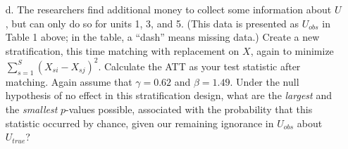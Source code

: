 \documentclass{article}
\newcommand\independent{\protect\mathpalette{\protect\independenT}{\perp}}
\def\independenT#1#2{\mathrel{\rlap{$#1#2$}\mkern2mu{#1#2}}}
\begin{document}

\begin{itemize}
\item[d.] The researchers find additional money to collect some
  information about $U$, but can only do so for units 1, 3, and 5.
  (This data is presented as $U_{obs}$ in Table 1 above; in the table,
  a ``dash'' means missing data.)  Create a new stratification, this
  time matching with replacement on $X$, again to minimize
  $\sum_{s=1}^{S}(X_{si}-X_{sj})^2$.  Calculate the ATT as your test
  statistic after matching.  Again assume that $\gamma=0.62$ and
  $\beta=1.49$.  Under the null hypothesis of no effect in this
  stratification design, what are the {\em largest} and the {\em
    smallest} $p$-values possible, associated with the probability
  that this statistic occurred by chance, given our remaining
  ignorance in $U_{obs}$ about $U_{true}$?





\end{itemize}



\end{document}
